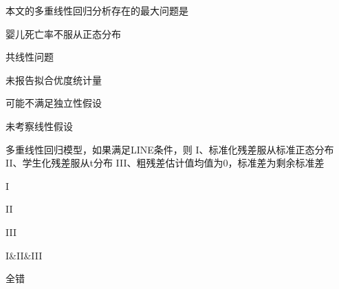 \par\addvspace{6pt}\noindent\begin{minipage}{\linewidth}


本文的多重线性回归分析存在的最大问题是


\begin{choices}

\item 婴儿死亡率不服从正态分布

\item 共线性问题

\item 未报告拟合优度统计量

\item 可能不满足独立性假设

\item 未考察线性假设

\end{choices}

\end{minipage}\par\vspace{4pt}

\par\addvspace{6pt}\noindent\begin{minipage}{\linewidth}


多重线性回归模型，如果满足LINE条件，则 I、标准化残差服从标准正态分布 II、学生化残差服从t分布 III、粗残差估计值均值为0，标准差为剩余标准差


\begin{choices}

\item I

\item II

\item III

\item I\&II\&III

\item 全错

\end{choices}

\end{minipage}\par\vspace{4pt}

